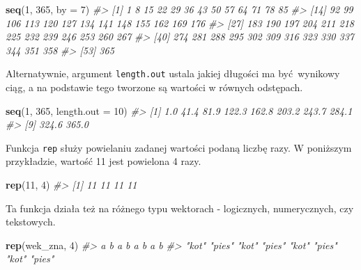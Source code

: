 \documentclass[paper=6in:9in,pagesize=pdftex,headinclude=on,footinclude=on,10pt]{scrbook}
\newenvironment{Shaded}{\begin{snugshade}}{\end{snugshade}}
\newcommand{\CommentTok}[1]{\textcolor[rgb]{0.56,0.35,0.01}{\textit{#1}}}
\newcommand{\DataTypeTok}[1]{\textcolor[rgb]{0.13,0.29,0.53}{#1}}
\newcommand{\DecValTok}[1]{\textcolor[rgb]{0.00,0.00,0.81}{#1}}
\newcommand{\KeywordTok}[1]{\textcolor[rgb]{0.13,0.29,0.53}{\textbf{#1}}}
\newcommand{\NormalTok}[1]{#1}
\begin{document}
\begin{Shaded}
\begin{Highlighting}[]
\KeywordTok{seq}\NormalTok{(}\DecValTok{1}\NormalTok{, }\DecValTok{365}\NormalTok{, }\DataTypeTok{by =} \DecValTok{7}\NormalTok{)}
\CommentTok{#>  [1]   1   8  15  22  29  36  43  50  57  64  71  78  85}
\CommentTok{#> [14]  92  99 106 113 120 127 134 141 148 155 162 169 176}
\CommentTok{#> [27] 183 190 197 204 211 218 225 232 239 246 253 260 267}
\CommentTok{#> [40] 274 281 288 295 302 309 316 323 330 337 344 351 358}
\CommentTok{#> [53] 365}
\end{Highlighting}
\end{Shaded}

Alternatywnie, argument \texttt{length.out} ustala jakiej długości ma być~wynikowy ciąg, a na podstawie tego tworzone są wartości w równych odstępach.

\begin{Shaded}
\begin{Highlighting}[]
\KeywordTok{seq}\NormalTok{(}\DecValTok{1}\NormalTok{, }\DecValTok{365}\NormalTok{, }\DataTypeTok{length.out =} \DecValTok{10}\NormalTok{)}
\CommentTok{#>  [1]   1.0  41.4  81.9 122.3 162.8 203.2 243.7 284.1}
\CommentTok{#>  [9] 324.6 365.0}
\end{Highlighting}
\end{Shaded}

Funkcja \texttt{rep} służy powielaniu zadanej wartości podaną liczbę razy.
W poniższym przykładzie, wartość 11 jest powielona 4 razy.

\begin{Shaded}
\begin{Highlighting}[]
\KeywordTok{rep}\NormalTok{(}\DecValTok{11}\NormalTok{, }\DecValTok{4}\NormalTok{)}
\CommentTok{#> [1] 11 11 11 11}
\end{Highlighting}
\end{Shaded}

Ta funkcja działa też na różnego typu wektorach - logicznych, numerycznych, czy tekstowych.

\begin{Shaded}
\begin{Highlighting}[]
\KeywordTok{rep}\NormalTok{(wek_zna, }\DecValTok{4}\NormalTok{)}
\CommentTok{#>      a      b      a      b      a      b      a      b }
\CommentTok{#>  "kot" "pies"  "kot" "pies"  "kot" "pies"  "kot" "pies"}
\end{Highlighting}
\end{Shaded}
\end{document}
